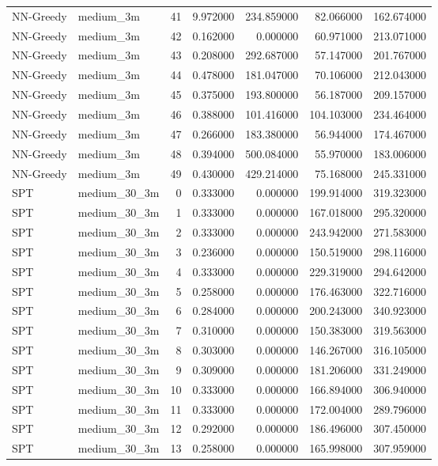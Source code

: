 \begin{tabular}{llrrrrr}
NN-Greedy & medium_3m & 41 & 9.972000 & 234.859000 & 82.066000 & 162.674000 \\
NN-Greedy & medium_3m & 42 & 0.162000 & 0.000000 & 60.971000 & 213.071000 \\
NN-Greedy & medium_3m & 43 & 0.208000 & 292.687000 & 57.147000 & 201.767000 \\
NN-Greedy & medium_3m & 44 & 0.478000 & 181.047000 & 70.106000 & 212.043000 \\
NN-Greedy & medium_3m & 45 & 0.375000 & 193.800000 & 56.187000 & 209.157000 \\
NN-Greedy & medium_3m & 46 & 0.388000 & 101.416000 & 104.103000 & 234.464000 \\
NN-Greedy & medium_3m & 47 & 0.266000 & 183.380000 & 56.944000 & 174.467000 \\
NN-Greedy & medium_3m & 48 & 0.394000 & 500.084000 & 55.970000 & 183.006000 \\
NN-Greedy & medium_3m & 49 & 0.430000 & 429.214000 & 75.168000 & 245.331000 \\
SPT & medium_30_3m & 0 & 0.333000 & 0.000000 & 199.914000 & 319.323000 \\
SPT & medium_30_3m & 1 & 0.333000 & 0.000000 & 167.018000 & 295.320000 \\
SPT & medium_30_3m & 2 & 0.333000 & 0.000000 & 243.942000 & 271.583000 \\
SPT & medium_30_3m & 3 & 0.236000 & 0.000000 & 150.519000 & 298.116000 \\
SPT & medium_30_3m & 4 & 0.333000 & 0.000000 & 229.319000 & 294.642000 \\
SPT & medium_30_3m & 5 & 0.258000 & 0.000000 & 176.463000 & 322.716000 \\
SPT & medium_30_3m & 6 & 0.284000 & 0.000000 & 200.243000 & 340.923000 \\
SPT & medium_30_3m & 7 & 0.310000 & 0.000000 & 150.383000 & 319.563000 \\
SPT & medium_30_3m & 8 & 0.303000 & 0.000000 & 146.267000 & 316.105000 \\
SPT & medium_30_3m & 9 & 0.309000 & 0.000000 & 181.206000 & 331.249000 \\
SPT & medium_30_3m & 10 & 0.333000 & 0.000000 & 166.894000 & 306.940000 \\
SPT & medium_30_3m & 11 & 0.333000 & 0.000000 & 172.004000 & 289.796000 \\
SPT & medium_30_3m & 12 & 0.292000 & 0.000000 & 186.496000 & 307.450000 \\
SPT & medium_30_3m & 13 & 0.258000 & 0.000000 & 165.998000 & 307.959000 \\

\end{tabular}
